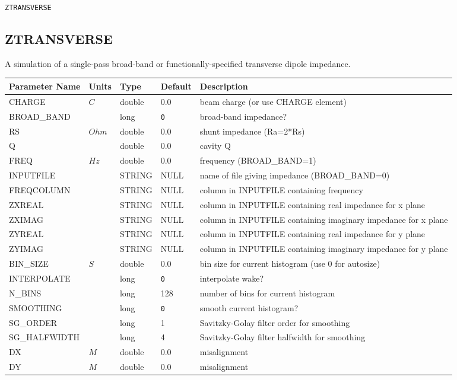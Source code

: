 \begin{latexonly}
\newpage
\begin{center}{\Large\verb|ZTRANSVERSE|}\end{center}
\end{latexonly}\subsection{ZTRANSVERSE}
A simulation of a single-pass broad-band or functionally-specified transverse dipole impedance.
\\
\begin{tabular}{|l|l|l|l|p{\descwidth}|} \hline
Parameter Name & Units & Type & Default & Description \\ \hline 
CHARGE & $C$ & double &  0.0 & beam charge (or use CHARGE element)  \\ \hline 
BROAD\_BAND &  & long &  \verb|0| & broad-band impedance?  \\ \hline 
RS & $Ohm$ & double &  0.0 & shunt impedance (Ra=2*Rs)  \\ \hline 
Q &  & double &  0.0 & cavity Q  \\ \hline 
FREQ & $Hz$ & double &  0.0 & frequency (BROAD\_BAND=1)  \\ \hline 
INPUTFILE &  & STRING &   NULL            & name of file giving impedance (BROAD\_BAND=0)  \\ \hline 
FREQCOLUMN &  & STRING &   NULL            & column in INPUTFILE containing frequency  \\ \hline 
ZXREAL &  & STRING &   NULL            & column in INPUTFILE containing real impedance for x plane  \\ \hline 
ZXIMAG &  & STRING &   NULL            & column in INPUTFILE containing imaginary impedance for x plane  \\ \hline 
ZYREAL &  & STRING &   NULL            & column in INPUTFILE containing real impedance for y plane  \\ \hline 
ZYIMAG &  & STRING &   NULL            & column in INPUTFILE containing imaginary impedance for y plane  \\ \hline 
BIN\_SIZE & $S$ & double &  0.0 & bin size for current histogram (use 0 for autosize)  \\ \hline 
INTERPOLATE &  & long &  \verb|0| & interpolate wake?  \\ \hline 
N\_BINS &  & long &   128             & number of bins for current histogram  \\ \hline 
SMOOTHING &  & long &  \verb|0| & smooth current histogram?  \\ \hline 
SG\_ORDER &  & long &   1               & Savitzky-Golay filter order for smoothing  \\ \hline 
SG\_HALFWIDTH &  & long &   4               & Savitzky-Golay filter halfwidth for smoothing  \\ \hline 
DX & $M$ & double &  0.0 & misalignment  \\ \hline 
DY & $M$ & double &  0.0 & misalignment  \\ \hline 
\end{tabular}

